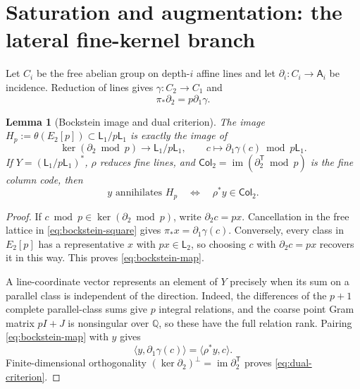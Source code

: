 \documentclass[12pt,a4paper]{article}
\newtheorem{lemma}[theorem]{Lemma}
\theoremstyle{definition}
\newcommand{\Q}{\mathbb Q}
\newcommand{\A}{\mathsf A}
\newcommand{\LL}{\mathsf L}
\newcommand{\im}{\operatorname{im}}
\newcommand{\transpose}{\mathsf T}
\begin{document}
\appendix

\section{Saturation and augmentation: the lateral fine-kernel branch}
\label{app:saturation}

Let $C_i$ be the free abelian group on depth-$i$ affine lines and let
$\partial_i:C_i\to\A_i$ be incidence.  Reduction of lines gives
$\gamma:C_2\to C_1$ and
\begin{equation}\label{eq:bockstein-square}
 \pi_*\partial_2=p\partial_1\gamma.
\end{equation}

\begin{lemma}[Bockstein image and dual criterion]
\label{lem:bockstein-dual}
The image $H_p:=\theta(E_2[p])\subset\LL_1/p\LL_1$ is exactly the image of
\begin{equation}\label{eq:bockstein-map}
 \ker(\partial_2\bmod p)\longrightarrow\LL_1/p\LL_1,
 \qquad c\longmapsto\partial_1\gamma(c)\bmod p\LL_1.
\end{equation}
If $Y=(\LL_1/p\LL_1)^*$, $\rho$ reduces fine lines, and
$\mathsf{Col}_2=\im(\partial_2^{\transpose}\bmod p)$ is the
fine column code, then
\begin{equation}\label{eq:dual-criterion}
 y\text{ annihilates }H_p
 \quad\Longleftrightarrow\quad \rho^*y\in\mathsf{Col}_2.
\end{equation}
\end{lemma}

\begin{proof}
If $c\bmod p\in\ker(\partial_2\bmod p)$, write
$\partial_2c=px$.  Cancellation in the free lattice in
\eqref{eq:bockstein-square} gives
$\pi_*x=\partial_1\gamma(c)$.  Conversely, every class in $E_2[p]$ has a
representative $x$ with $px\in\LL_2$, so choosing $c$ with
$\partial_2c=px$ recovers it in this way.  This proves
\eqref{eq:bockstein-map}.

A line-coordinate vector represents an element of $Y$ precisely when its
sum on a parallel class is independent of the direction.  Indeed, the
differences of the $p+1$ complete parallel-class sums give $p$ integral
relations, and the coarse point Gram matrix $pI+J$ is nonsingular over
$\Q$, so these have the full relation rank.  Pairing
\eqref{eq:bockstein-map} with $y$ gives
\[
 \langle y,\partial_1\gamma(c)\rangle
 =\langle\rho^*y,c\rangle.
\]
Finite-dimensional orthogonality
$(\ker\partial_2)^\perp=\im\partial_2^{\transpose}$ proves
\eqref{eq:dual-criterion}.
\end{proof}
\end{document}
